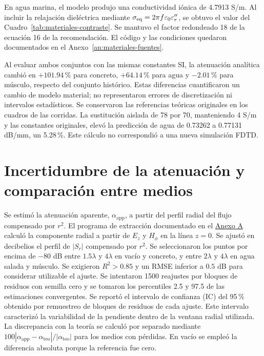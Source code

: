 En agua marina, el modelo produjo una conductividad iónica de 4.7913 S/m. Al incluir la relajación dieléctrica mediante $\sigma_{\rm eq}=2\pi f\varepsilon_0\varepsilon_r''$, se obtuvo el valor del Cuadro~\ref{tab:materiales-contraste}. Se mantuvo el factor redondeado 18 de la ecuación 16 de la recomendación. El código y las condiciones quedaron documentados en el Anexo~\ref{an:materiales-fuentes}.

Al evaluar ambos conjuntos con las mismas constantes SI, la atenuación analítica cambió en $+101.94$\,\% para concreto, $+64.14$\,\% para agua y $-2.01$\,\% para músculo, respecto del conjunto histórico. Estas diferencias cuantificaron un cambio de modelo material; no representaron errores de discretización ni intervalos estadísticos. Se conservaron las referencias teóricas originales en los cuadros de las corridas. La sustitución aislada de 78 por 70, manteniendo 4 S/m y las constantes originales, elevó la predicción de agua de 0.73262 a 0.77131 dB/mm, un 5.28\,\%. Este cálculo no correspondió a una nueva simulación FDTD.

\section{Incertidumbre de la atenuación y comparación entre medios}
Se estimó la atenuación aparente, $\alpha_{\mathrm{app}}$, a partir del perfil radial del flujo compensado por $r^2$. El programa de extracción documentado en el \hyperref[an:fdtd-fuentes]{Anexo A} calculó la componente radial a partir de $E_z$ y $H_\phi$ en la línea $z=0$. Se ajustó en decibelios el perfil de $|S_r|$ compensado por $r^2$. Se seleccionaron los puntos por encima de $-80$ dB entre $1.5\lambda$ y $4\lambda$ en vacío y concreto, y entre $2\lambda$ y $4\lambda$ en agua salada y músculo. Se exigieron $R^2>0.85$ y un RMSE inferior a $0.5$ dB para considerar utilizable el ajuste. Se intentaron 1500 reajustes por bloques de residuos con semilla cero y se tomaron los percentiles 2.5 y 97.5 de las estimaciones convergentes. Se reportó el intervalo de confianza (IC) del 95\,\% obtenido por remuestreo de bloques de residuos de cada ajuste. Este intervalo caracterizó la variabilidad de la pendiente dentro de la ventana radial utilizada. La discrepancia con la teoría se calculó por separado mediante $100|\alpha_{\mathrm{app}}-\alpha_{\mathrm{teo}}|/|\alpha_{\mathrm{teo}}|$ para los medios con pérdidas. En vacío se empleó la diferencia absoluta porque la referencia fue cero.

